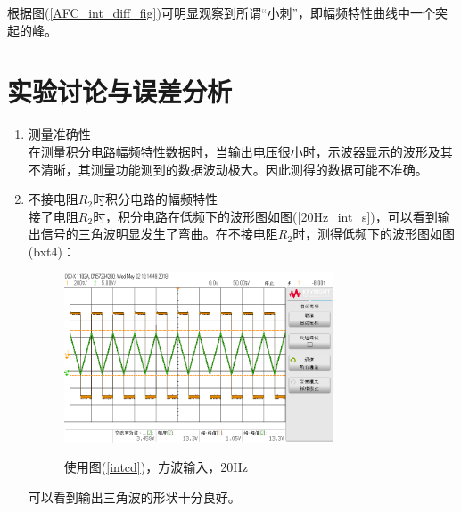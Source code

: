 \documentclass[a4paper]{article}
\begin{document}
根据图(\ref{AFC_int_diff_fig})可明显观察到所谓“小刺”，即幅频特性曲线中一个突起的峰。

\section{实验讨论与误差分析}
\begin{enumerate}
\item 测量准确性\\
在测量积分电路幅频特性数据时，当输出电压很小时，示波器显示的波形及其不清晰，其测量功能测到的数据波动极大。因此测得的数据可能不准确。
\item 不接电阻$R_2$时积分电路的幅频特性\\
接了电阻$R_2$时，积分电路在低频下的波形图如图(\ref{20Hz_int_s})，可以看到输出信号的三角波明显发生了弯曲。在不接电阻$R_2$时，测得低频下的波形图如图(bxt4)：
\begin{figure}[!h]
\centering
\includegraphics[width=8cm]{fig/scope_4.png}\\
\caption{使用图(\ref{intcd})，方波输入，20Hz}\label{bxt4}
\end{figure}

可以看到输出三角波的形状十分良好。
\end{enumerate}
\end{document}
